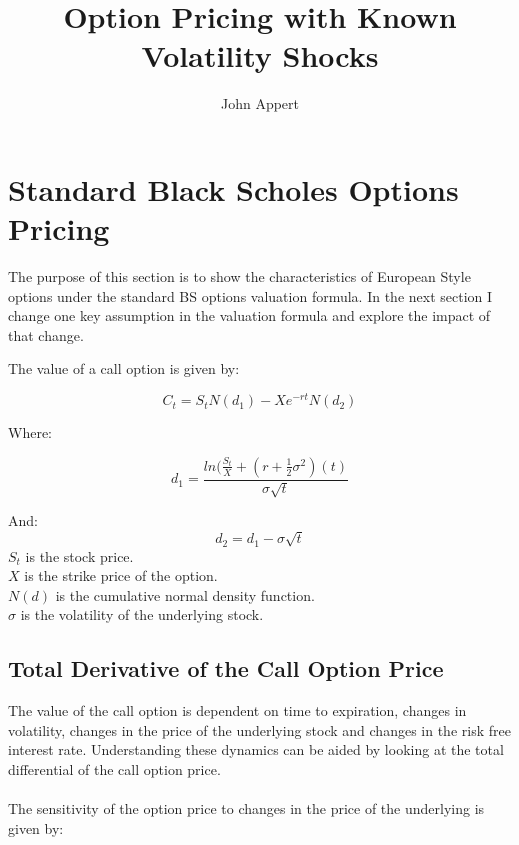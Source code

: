 \documentclass{article}
\begin{document}
\title{Option Pricing with Known Volatility Shocks}
\author{John Appert}
\maketitle


\section{Standard Black Scholes Options Pricing}

The purpose of this section is to show the characteristics of European Style options under the standard BS options valuation formula.  In the next section I change one key assumption in the valuation formula and explore the impact of that change.

The value of a call option is given by:

\begin{equation}C_{t}=S_{t}N(d_{1})-Xe^{-rt}N(d_{2})
\end{equation}

Where:

\begin{equation}
d_{1}=\frac{ln(\frac{S_{t}}{X}+(r +\frac{1}{2}\sigma^{2})(t)}{\sigma\sqrt{t}}
\end{equation}

And:
\begin{equation}
d_{2}=d_{1}-\sigma\sqrt{t}
\end{equation}
$S_{t}$ is the stock price.\\
$X$ is the strike price of the option.\\
$N(d)$ is the cumulative normal density function.\\
$\sigma$ is the volatility of the underlying stock.

\subsection{Total Derivative of the Call Option Price}

The value of the call option is dependent on time to expiration, changes in volatility, changes in the price of the underlying stock and changes in the risk free interest rate.  Understanding these dynamics can be aided by looking at the total differential of the call option price.\\
\\
The sensitivity of the option price to changes in the price of the underlying is given by:
\end{document}

